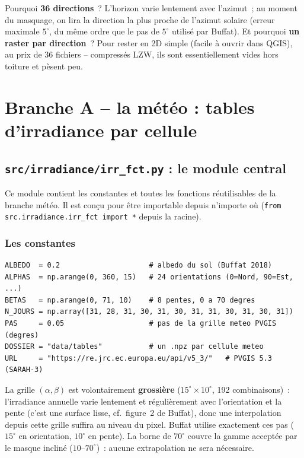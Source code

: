 \documentclass[11pt,a4paper]{article}
\newcommand{\fichier}[1]{\texttt{#1}}
\newcommand{\fonction}[1]{\texttt{#1}}
\begin{document}
Pourquoi \textbf{36 directions}~? L'horizon varie lentement avec l'azimut~; au
moment du masquage, on lira la direction la plus proche de l'azimut solaire
(erreur maximale $5^\circ$, du même ordre que le pas de $5^\circ$ utilisé par
Buffat). Et pourquoi \textbf{un raster par direction}~? Pour rester en 2D simple
(facile à ouvrir dans QGIS), au prix de 36 fichiers -- compressés LZW, ils sont
essentiellement vides hors toiture et pèsent peu.

\section{Branche A -- la météo : tables d'irradiance par cellule}

\subsection{\fichier{src/irradiance/irr\_fct.py} : le module central}

Ce module contient les constantes et toutes les fonctions réutilisables de la
branche météo. Il est conçu pour être importable depuis n'importe où
(\fonction{from src.irradiance.irr\_fct import *} depuis la racine).

\subsubsection{Les constantes}

\begin{lstlisting}
ALBEDO  = 0.2                     # albedo du sol (Buffat 2018)
ALPHAS  = np.arange(0, 360, 15)   # 24 orientations (0=Nord, 90=Est, ...)
BETAS   = np.arange(0, 71, 10)    # 8 pentes, 0 a 70 degres
N_JOURS = np.array([31, 28, 31, 30, 31, 30, 31, 31, 30, 31, 30, 31])
PAS     = 0.05                    # pas de la grille meteo PVGIS (degres)
DOSSIER = "data/tables"           # un .npz par cellule meteo
URL     = "https://re.jrc.ec.europa.eu/api/v5_3/"   # PVGIS 5.3 (SARAH-3)
\end{lstlisting}

La grille $(\alpha, \beta)$ est volontairement \textbf{grossière}
($15^\circ \times 10^\circ$, 192 combinaisons)~: l'irradiance annuelle varie
lentement et régulièrement avec l'orientation et la pente (c'est une surface
lisse, cf.~figure~2 de Buffat), donc une interpolation depuis cette grille
suffira au niveau du pixel. Buffat utilise exactement ces pas ($15^\circ$ en
orientation, $10^\circ$ en pente). La borne de $70^\circ$ couvre la gamme
acceptée par le masque incliné ($10$--$70^\circ$)~: aucune extrapolation ne sera
nécessaire.
\end{document}
